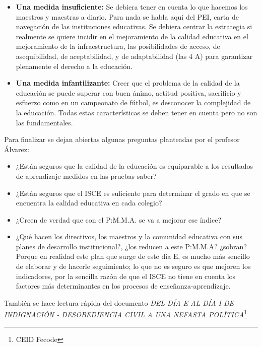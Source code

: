 \documentclass[10pt,letterpaper]{article}
\begin{document}
\begin{itemize}
\item \textbf{Una medida insuficiente:} Se debiera tener en cuenta lo que hacemos los maestros y maestras a diario. Para nada se habla aquí del PEI, carta de navegación de las instituciones educativas. Se debiera centrar la estrategia si realmente se quiere incidir en el mejoramiento de la calidad educativa en el mejoramiento de la infraestructura, las posibilidades de acceso, de asequibilidad, de aceptabilidad, y de adaptabilidad (las 4 A) para garantizar plenamente el derecho a la educación.
\item \textbf{Una medida infantilizante:} Creer que el problema de la calidad de la educación se puede superar con buen ánimo, actitud positiva, sacrificio y esfuerzo como en un campeonato de fútbol, es desconocer la complejidad de la educación. Todas estas características se deben tener en cuenta pero no son las fundamentales.
\end{itemize}
Para finalizar se dejan abiertas algunas preguntas planteadas por el profesor Álvarez:
\begin{itemize}
\item ¿Están seguros que la calidad de la educación es equiparable a los resultados de aprendizaje medidos en las pruebas saber?
\item ¿Están seguros que el ISCE es suficiente para determinar el grado en que se encuentra la calidad educativa en cada colegio?
\item ¿Creen de verdad que con el P:M.M.A. se va a mejorar ese índice?
\item ¿Qué hacen los directivos, los maestros y la comunidad educativa con sus planes de desarrollo institucional?, ¿los reducen a este  P:M.M.A? ¿sobran? Porque en realidad este plan que surge de este día E, es mucho más sencillo de elaborar y de hacerle seguimiento; lo que no es seguro es que mejoren los indicadores, por la sencilla razón de que el ISCE no tiene en cuenta los factores más determinantes en los procesos de enseñanza-aprendizaje.
\end{itemize}
También se hace lectura rápida del documento \emph{DEL DÍA E AL DÍA I DE INDIGNACIÓN - DESOBEDIENCIA CIVIL A UNA NEFASTA POLÍTICA}\footnote{CEID Fecode}
\end{document}
